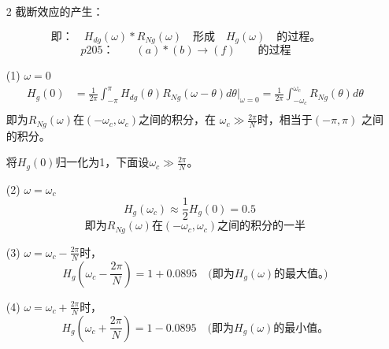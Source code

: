 \documentclass[notheorems,compress,mathserif,table]{beamer}
\begin{document}
\begin{frame}[allowframebreaks]\frametitle{}%
\begin{enumerate}
\item [2] 截断效应的产生：
\end{enumerate}

      $$\mbox{即：}\quad H_{dg}(\omega)\ast R_{Ng}(\omega)\quad\mbox{形成}\quad H_g(\omega)\quad\mbox{的过程。}$$
      $$p205：\quad\quad
      (a)\ast (b)\longrightarrow (f)
      \quad\quad\mbox{的过程}$$
      \begin{enumerate}
        \item[(1)] $\omega=0$
        \begin{equation*}
            \begin{split}
            H_g(0)
              &= \frac{1}{2\pi}\int_{-\pi}^{\pi}
                 H_{dg}(\theta)R_{Ng}(\omega-\theta)d\theta |_{\omega=0}
              = \frac{1}{2\pi}\int_{-\omega_c}^{\omega_c}%
                 R_{Ng}(\theta)d\theta\\
            \end{split}
        \end{equation*}
          即为$R_{Ng}(\omega)$在$(-\omega_c,\omega_c )$之间的积分，在
          $\omega_c \gg \frac{2\pi}{N}$时，相当于$(-\pi,\pi)$ 之间的积分。

          将$H_g(0)$归一化为1，下面设$\omega_c \gg \frac{2\pi}{N}$。
        \item[(2)]$\omega = \omega_c$
            $$H_g(\omega_c) \approx \frac{1}{2}H_g(0)=0.5\quad$$
            $$\mbox{即为$R_{Ng}(\omega)$在$(-\omega_c,\omega_c)$之间的积分的一半}$$
        \item[(3)] $\omega = \omega_c-\frac{2\pi}{N}$时，
            $$H_g(\omega_c-\frac{2\pi}{N}) = 1+0.0895\quad
            \mbox{(即为$H_g(\omega)$的最大值。)}$$
        \item[(4)] $\omega = \omega_c+\frac{2\pi}{N}$时，
            $$H_g(\omega_c+\frac{2\pi}{N}) = 1-0.0895\quad
            \mbox{(即为$H_g(\omega)$的最小值。}$$
      \end{enumerate}
\end{frame}
\end{document}
